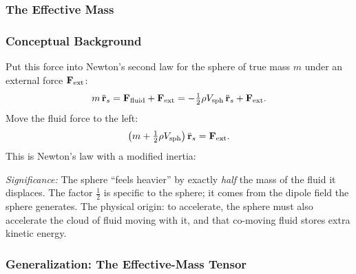 \documentclass[../main.tex]{subfiles}
\begin{document}
\subsubsection{The Effective Mass}

\subsubsection*{Conceptual Background}
Put this force into Newton's second law for the sphere of true mass $m$ under an external force $\mathbf{F}_{\text{ext}}$:
\begin{equation}
  m\,\ddot{\mathbf{r}}_s = \mathbf{F}_{\text{fluid}} + \mathbf{F}_{\text{ext}}
  = -\tfrac{1}{2}\rho V_{\text{sph}}\,\ddot{\mathbf{r}}_s + \mathbf{F}_{\text{ext}}.
  \label{eq:lec16_newton}
\end{equation}
Move the fluid force to the left:
\begin{equation}
  \left(m + \tfrac{1}{2}\rho V_{\text{sph}}\right)\ddot{\mathbf{r}}_s = \mathbf{F}_{\text{ext}}.
  \label{eq:lec16_newton_eff}
\end{equation}
This is Newton's law with a modified inertia:

\textit{Significance:} The sphere ``feels heavier'' by exactly \emph{half} the mass of the fluid it displaces. The factor $\tfrac{1}{2}$ is specific to the sphere; it comes from the dipole field the sphere generates. The physical origin: to accelerate, the sphere must also accelerate the cloud of fluid moving with it, and that co-moving fluid stores extra kinetic energy.


\subsubsection{Generalization: The Effective-Mass Tensor}
\end{document}
